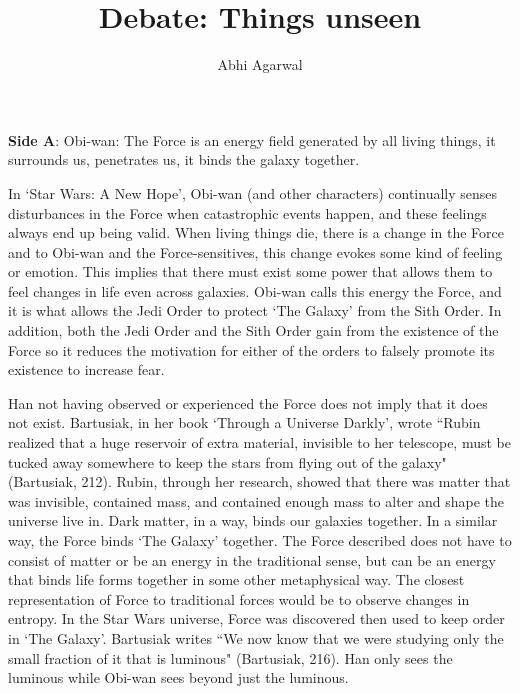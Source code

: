 \documentclass[11pt, oneside]{article}
\title{Debate: Things unseen\vspace{-0.4cm}}
\author{Abhi Agarwal\vspace{-1cm}}
\date{}
\begin{document}
\maketitle

\noindent \textbf{Side A}: Obi-wan: The Force is an energy field generated by all living things, it surrounds us, penetrates us, it binds the galaxy together.

\par In `Star Wars: A New Hope', Obi-wan (and other characters) continually senses disturbances in the Force when catastrophic events happen, and these feelings always end up being valid. When living things die, there is a change in the Force and to Obi-wan and the Force-sensitives, this change evokes some kind of feeling or emotion. This implies that there must exist some power that allows them to feel changes in life even across galaxies. Obi-wan calls this energy the Force, and it is what allows the Jedi Order to protect `The Galaxy' from the Sith Order. In addition, both the Jedi Order and the Sith Order gain from the existence of the Force so it reduces the motivation for either of the orders to falsely promote its existence to increase fear.

\par Han not having observed or experienced the Force does not imply that it does not exist. Bartusiak, in her book `Through a Universe Darkly', wrote ``Rubin realized that a huge reservoir of extra material, invisible to her telescope, must be tucked away somewhere to keep the stars from flying out of the galaxy" (Bartusiak, 212). Rubin, through her research, showed that there was matter that was invisible, contained mass, and contained enough mass to alter and shape the universe live in. Dark matter, in a way, binds our galaxies together. In a similar way, the Force binds `The Galaxy' together. The Force described does not have to consist of matter or be an energy in the traditional sense, but can be an energy that binds life forms together in some other metaphysical way. The closest representation of Force to traditional forces would be to observe changes in entropy. In the Star Wars universe, Force was discovered then used to keep order in `The Galaxy'. Bartusiak writes ``We now know that we were studying only the small fraction of it that is luminous" (Bartusiak, 216). Han only sees the luminous while Obi-wan sees beyond just the luminous.
\end{document}
